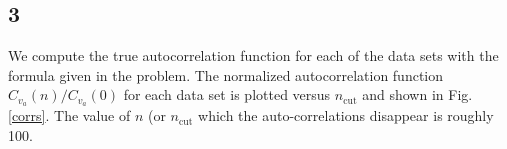 \documentclass[singlepage,notitlepage,nofootinbib,11pt]{revtex4-1}
\begin{document}
\subsection{3}
We compute the true autocorrelation function for each of the data sets with the formula given in the problem. The normalized autocorrelation function $C_{v_a}(n)/C_{v_a}(0)$ for each data set is plotted versus $n_{\text{cut}}$ and shown in Fig. \ref{corrs}. The value of $n$ (or $n_{\text{cut}}$ which the auto-correlations disappear is roughly 100.
\begin{figure}[h]
  \centering
  \captionsetup[subfigure]{labelformat=empty}
  \\
  \\

\end{figure}
\end{document}
